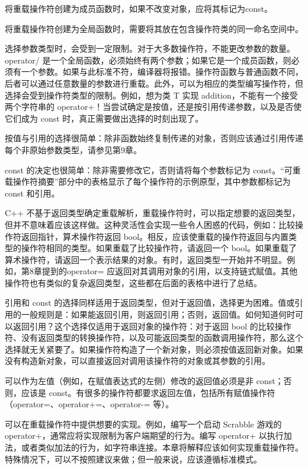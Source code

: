 将重载操作符创建为成员函数时，如果不改变对象，应将其标记为const。

将重载操作符创建为全局函数时，需要将其放在包含操作符类的同一命名空间中。


选择参数类型时，会受到一定限制。对于大多数操作符，不能更改参数的数量。operator/ 是一个全局函数，必须始终有两个参数；如果它是一个成员函数，则必须有一个参数。如果与此标准不符，编译器将报错。操作符函数与普通函数不同，后者可以通过任意数量的参数进行重载。此外，可以为相应的类型编写操作符，但选择会受到操作符类型的限制。例如，想为类 T 实现 addition，不能有一个接受两个字符串的 operator+！当尝试确定是按值，还是按引用传递参数，以及是否使它们成为 const 时，真正需要做出选择的时刻出现了。

按值与引用的选择很简单：除非函数始终复制传递的对象，否则应该通过引用传递每个非原始参数类型，请参见第9章。

const 的决定也很简单：除非需要修改它，否则请将每个参数标记为 const。“可重载操作符摘要”部分中的表格显示了每个操作符的示例原型，其中参数都标记为 const 和引用。


C++ 不基于返回类型确定重载解析，重载操作符时，可以指定想要的返回类型，但并不意味着应该这样做。这种灵活性会实现一些令人困惑的代码，例如：比较操作符返回指针，算术操作符返回 bool。相反，应该使重载的操作符返回与内置类型的操作符相同的类型。如果重载了比较操作符，请返回一个 bool。如果重载了算术操作符，请返回一个表示结果的对象。有时，返回类型一开始并不明显。例如，第8章提到的operator= 应返回对其调用对象的引用，以支持链式赋值。其他操作符也有类似的复杂返回类型，这些都在后面的表格中进行了总结。

引用和 const 的选择同样适用于返回类型，但对于返回值，选择更为困难。值或引用的一般规则是：如果能返回引用，则返回引用；否则，返回值。如何知道何时可以返回引用？这个选择仅适用于返回对象的操作符：对于返回 bool 的比较操作符、没有返回类型的转换操作符，以及可能返回类型的函数调用操作符，那么这个选择就无关紧要了。如果操作符构造了一个新对象，则必须按值返回新对象。如果没有构造新对象，可以直接返回对调用该操作符的对象或其参数的引用。

可以作为左值（例如，在赋值表达式的左侧）修改的返回值必须是非 const；否则，应该是 const。有很多的操作符都要求返回左值，包括所有赋值操作符（operator=、operator+=、operator-= 等）。


可以在重载操作符中提供想要的实现。例如，编写一个启动 Scrabble 游戏的 operator+，通常应将实现限制为客户端期望的行为。编写 operator+ 以执行加法，或者类似加法的行为，如字符串连接。本章将解释应该如何实现重载操作符。特殊情况下，可以不按照建议来做；但一般来说，应该遵循标准模式。


